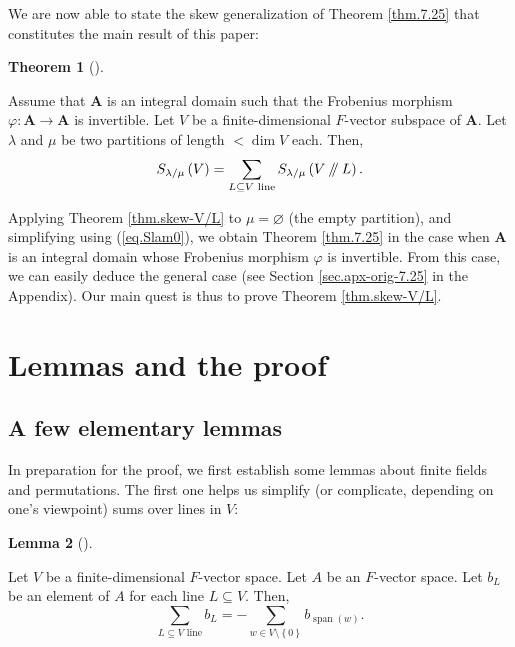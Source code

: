 \documentclass[numbers=enddot,12pt,final,onecolumn,notitlepage]{scrartcl}%
\numberwithin{exer}{section}
\theoremstyle{definition}
\newtheorem{theo}{Theorem}[section]
\newenvironment{theorem}[1][]
{\begin{theo}[#1]\begin{leftbar}}
{\end{leftbar}\end{theo}}
\newtheorem{lem}[theo]{Lemma}
\newenvironment{lemma}[1][]
{\begin{lem}[#1]\begin{leftbar}}
{\end{leftbar}\end{lem}}
\let\sumnonlimits\sum
\renewcommand{\sum}{\sumnonlimits\limits}
\newcommand{\sslash}{\mathbin{/\mkern-5mu/}}
\theoremstyle{plainsl}
\begin{document}
We are now able to state the skew generalization of Theorem \ref{thm.7.25}
that constitutes the main result of this paper:


\begin{theorem}
\label{thm.skew-V/L}Assume that $\mathbf{A}$ is an integral domain such that
the Frobenius morphism $\varphi:\mathbf{A}\rightarrow\mathbf{A}$ is
invertible. Let $V$ be a finite-dimensional $F$-vector subspace of
$\mathbf{A}$. Let $\lambda$ and $\mu$ be two partitions of length $<\dim V$
each. Then,%
\[
S_{\lambda/\mu}\left(  V\right)  =\sum_{L\subseteq V\text{ line}}%
S_{\lambda/\mu}\left(  V\sslash L\right)  .
\]

\end{theorem}


Applying Theorem \ref{thm.skew-V/L} to $\mu=\varnothing$ (the empty
partition), and simplifying using (\ref{eq.Slam0}), we obtain Theorem
\ref{thm.7.25} in the case when $\mathbf{A}$ is an integral domain whose
Frobenius morphism $\varphi$ is invertible. From this case, we can easily
deduce the general case (see Section \ref{sec.apx-orig-7.25} in the Appendix).
Our main quest is thus to prove Theorem \ref{thm.skew-V/L}.


\section{Lemmas and the proof}

\subsection{A few elementary lemmas}

In preparation for the proof, we first establish some lemmas about finite
fields and permutations. The first one helps us simplify (or complicate,
depending on one's viewpoint) sums over lines in $V$:

\begin{lemma}
\label{lem.linesum}Let $V$ be a finite-dimensional $F$-vector space. Let $A$
be an $F$-vector space. Let $b_{L}$ be an element of $A$ for each line
$L\subseteq V$. Then,%
\[
\sum_{L\subseteq V\text{ line}}b_{L}=-\sum_{w\in V\setminus\left\{  0\right\}
}b_{\operatorname*{span}\left(  w\right)  }.
\]

\end{lemma}
\end{document}
